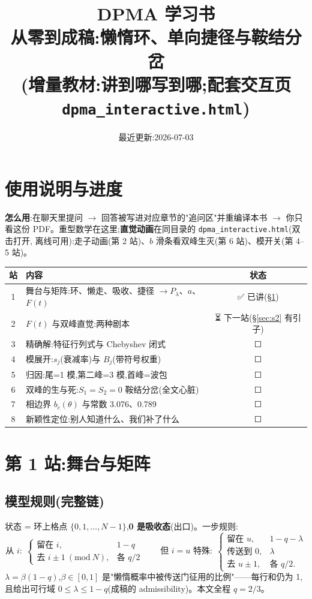 \documentclass[11pt]{article}
\title{\bf DPMA 学习书\\[2pt]\large 从零到成稿:懒惰环、单向捷径与鞍结分岔\\[4pt]
\normalsize (增量教材:讲到哪写到哪;配套交互页 \texttt{dpma\_interactive.html})}
\author{}
\date{最近更新:2026-07-03}
\begin{document}
\maketitle

\section*{使用说明与进度}
\textbf{怎么用}:在聊天里提问 $\to$ 回答被写进对应章节的"追问区"并重编译本书 $\to$ 你只看这份
PDF。重型数学在这里;\textbf{直觉动画}在同目录的 \texttt{dpma\_interactive.html}(双击打开,
离线可用):走子动画(第 2 站)、$b$ 滑条看双峰生灭(第 6 站)、模开关(第 4--5 站)。

\begin{center}
\begin{tabular}{clc}
\toprule
站 & 内容 & 状态\\
\midrule
1 & 舞台与矩阵:环、懒走、吸收、捷径 $\to P_\lambda$、$a$、$F(t)$ & ✅ 已讲(\S\ref{sec:s1})\\
2 & $F(t)$ 与双峰直觉:两种剧本 & ⏳ 下一站(\S\ref{sec:s2} 有引子)\\
3 & 精确解:特征行列式与 Chebyshev 闭式 & ☐\\
4 & 模展开:$s_j$(衰减率)与 $B_j$(带符号权重) & ☐\\
5 & 归因:尾=1 模,第二峰=3 模,首峰=波包 & ☐\\
6 & 双峰的生与死:$S_1=S_2=0$ 鞍结分岔(全文心脏) & ☐\\
7 & 相边界 $b_c(\theta)$ 与常数 3.076、0.789 & ☐\\
8 & 新颖性定位:别人知道什么、我们补了什么 & ☐\\
\bottomrule
\end{tabular}
\end{center}

\section{第 1 站:舞台与矩阵}\label{sec:s1}

\subsection{模型规则(完整链)}
状态 = 环上格点 $\{0,1,\dots,N-1\}$,\textbf{0 是吸收态}(出口)。一步规则:
\[
\text{从 } i:\;
\begin{cases}
\text{留在 } i, & 1-q\\[1pt]
\text{去 } i\pm1 \ (\mathrm{mod}\ N), & \text{各 } q/2
\end{cases}
\qquad
\text{但 } i=u \text{ 特殊}:\;
\begin{cases}
\text{留在 } u, & 1-q-\lambda\\[1pt]
\text{传送到 } 0, & \lambda\\[1pt]
\text{去 } u\pm1, & \text{各 } q/2 .
\end{cases}
\]
$\lambda=\beta(1-q)$,$\beta\in[0,1]$ 是"懒惰概率中被传送门征用的比例"——每行和仍为 1,
且给出可行域 $0\le\lambda\le1-q$(成稿的 admissibility)。本文全程 $q=2/3$。
\end{document}
